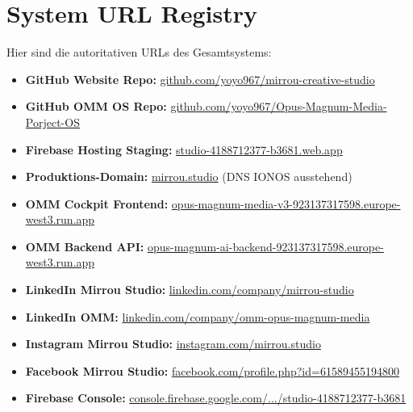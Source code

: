 \documentclass[11pt,a4paper]{article}
\begin{document}
\section{System URL Registry}
Hier sind die autoritativen URLs des Gesamtsystems:

\begin{itemize}
    \item \textbf{GitHub Website Repo:} \href{https://github.com/yoyo967/mirrou-creative-studio}{github.com/yoyo967/mirrou-creative-studio}
    \item \textbf{GitHub OMM OS Repo:} \href{https://github.com/yoyo967/Opus-Magnum-Media-Porject-OS}{github.com/yoyo967/Opus-Magnum-Media-Porject-OS}
    \item \textbf{Firebase Hosting Staging:} \href{https://studio-4188712377-b3681.web.app}{studio-4188712377-b3681.web.app}
    \item \textbf{Produktions-Domain:} \href{https://mirrou.studio}{mirrou.studio} (DNS IONOS ausstehend)
    \item \textbf{OMM Cockpit Frontend:} \href{https://opus-magnum-media-v3-923137317598.europe-west3.run.app}{opus-magnum-media-v3-923137317598.europe-west3.run.app}
    \item \textbf{OMM Backend API:} \href{https://opus-magnum-ai-backend-923137317598.europe-west3.run.app}{opus-magnum-ai-backend-923137317598.europe-west3.run.app}
    \item \textbf{LinkedIn Mirrou Studio:} \href{https://www.linkedin.com/company/mirrou-studio/}{linkedin.com/company/mirrou-studio}
    \item \textbf{LinkedIn OMM:} \href{https://www.linkedin.com/company/omm-opus-magnum-media/}{linkedin.com/company/omm-opus-magnum-media}
    \item \textbf{Instagram Mirrou Studio:} \href{https://www.instagram.com/mirrou.studio/}{instagram.com/mirrou.studio}
    \item \textbf{Facebook Mirrou Studio:} \href{https://www.facebook.com/profile.php?id=61589455194800}{facebook.com/profile.php?id=61589455194800}
    \item \textbf{Firebase Console:} \href{https://console.firebase.google.com/project/studio-4188712377-b3681/overview}{console.firebase.google.com/.../studio-4188712377-b3681}
\end{itemize}
\end{document}
